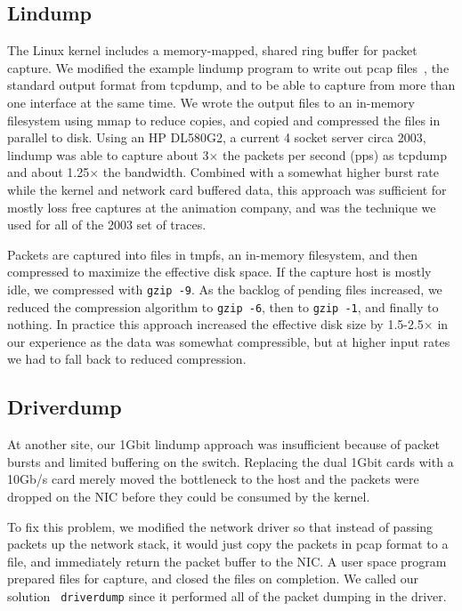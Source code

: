 \subsection{Lindump}

The Linux kernel includes a memory-mapped, shared ring buffer for
packet capture.  We modified the example lindump program to write out
pcap files~\cite{pcap}, the standard output format from tcpdump, and
to be able to capture from more than one interface at the same time.
We wrote the output files to an in-memory filesystem using mmap to
reduce copies, and copied and compressed the files in parallel to
disk.  Using an HP DL580G2, a current 4 socket server circa 2003,
lindump was able to capture about 3$\times$ the packets per second (pps) as
tcpdump and about 1.25$\times$ the bandwidth.  Combined with a somewhat
higher burst rate while the kernel and network card buffered data,
this approach was sufficient for mostly loss free captures at the animation
company, and was the technique we used for all of the 2003 set of
traces.

Packets are captured into files in tmpfs, an in-memory filesystem, and then compressed
to maximize the effective disk space.  If the capture host is mostly
idle, we compressed with {\tt gzip -9}. As the backlog of pending
files increased, we reduced the compression algorithm to {\tt gzip
-6}, then to {\tt gzip -1}, and finally to nothing.  In practice this
approach increased the effective disk size by 1.5-2.5$\times$ in our
experience as the data was somewhat compressible, but at higher input
rates we had to fall back to reduced compression.

\subsection{Driverdump}

At another site, our 1Gbit lindump approach was insufficient because
of packet bursts and limited buffering on the switch.  Replacing the
dual 1Gbit cards with a 10Gb/s card merely moved the bottleneck to the
host and the packets were dropped on the NIC before they could be
consumed by the kernel.

To fix this problem, we modified the network driver so that instead of
passing packets up the network stack, it would just copy the packets
in pcap format to a file, and immediately return the packet
buffer to the NIC.  A user space program prepared files for capture,
and closed the files on completion.  We called our solution {\tt
driverdump} since it performed all of the packet dumping in the
driver.

